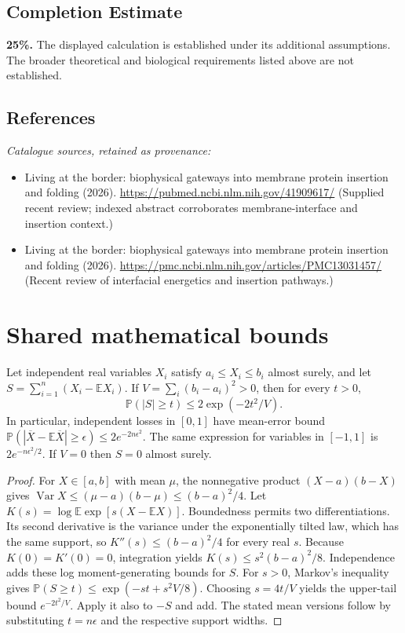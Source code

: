 \documentclass[11pt]{article}
\begin{document}
\subsection{Completion Estimate}
\textbf{25\%.} The displayed calculation is established under its additional assumptions. The broader theoretical and biological requirements listed above are not established.
\subsection{References}
\noindent\emph{Catalogue sources, retained as provenance:}
\begin{itemize}
\item Living at the border: biophysical gateways into membrane protein insertion and folding (2026). \url{https://pubmed.ncbi.nlm.nih.gov/41909617/} (Supplied recent review; indexed abstract corroborates membrane-interface and insertion context.)
\item Living at the border: biophysical gateways into membrane protein insertion and folding (2026). \url{https://pmc.ncbi.nlm.nih.gov/articles/PMC13031457/} (Recent review of interfacial energetics and insertion pathways.)
\end{itemize}




\section{Shared mathematical bounds}\label{app:bounds}
\begin{lemma}\label{lem:bounded}
Let independent real variables $X_i$ satisfy $a_i\leq X_i\leq b_i$ almost surely,
and let $S=\sum_{i=1}^n(X_i-\mathbb{E} X_i)$. If
$V=\sum_i(b_i-a_i)^2>0$, then for every $t>0$,
\[
 \mathbb{P}(|S|\geq t)\leq 2\exp(-2t^2/V).
\]
In particular, independent losses in $[0,1]$ have mean-error bound
$\mathbb{P}(|\overline X-\mathbb{E}\overline X|\geq\epsilon)
\leq2e^{-2n\epsilon^2}$. The same expression for variables in $[-1,1]$
is $2e^{-n\epsilon^2/2}$. If $V=0$ then $S=0$ almost surely.
\end{lemma}
\begin{proof}
For $X\in[a,b]$ with mean $\mu$, the nonnegative product
$(X-a)(b-X)$ gives
$\operatorname{Var} X\leq(\mu-a)(b-\mu)\leq(b-a)^2/4$.
Let $K(s)=\log\mathbb{E}\exp[s(X-\mathbb{E} X)]$.
Boundedness permits two differentiations. Its second derivative is the variance
under the exponentially tilted law, which has the same support, so
$K''(s)\leq(b-a)^2/4$ for every real $s$.
Because $K(0)=K'(0)=0$, integration yields
$K(s)\leq s^2(b-a)^2/8$.
Independence adds these log moment-generating bounds for $S$.
For $s>0$, Markov's inequality gives
$\mathbb{P}(S\geq t)\leq\exp(-st+s^2V/8)$.
Choosing $s=4t/V$ yields the upper-tail bound $e^{-2t^2/V}$.
Apply it also to $-S$ and add. The stated mean versions follow by substituting
$t=n\epsilon$ and the respective support widths.
\end{proof}
\end{document}
